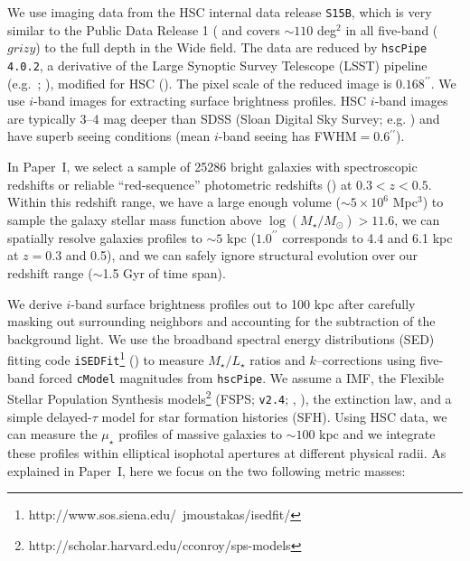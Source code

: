 \documentclass[a4paper,fleqn,usenatbib]{mnras}
\def\arcsec{{\prime\prime}}
\def\asec{$^{\prime\prime}$}
\def\cmodel{\texttt{cModel}}
\def\logms{{$\log (M_{\star}/M_{\odot})$}}
\def\m2l{{$M_{\star}/L_{\star}$}}
\def\mden{{$\mu_{\star}$}}
\begin{document}
    We use imaging data from the HSC internal data release 
    \texttt{S15B}, which is very similar to the Public Data Release 1 
    (\citealt{HSC-DR1} and covers ${\sim} 110$ deg$^2$ in all five-band ($grizy$) to 
    the full depth in the Wide field. 
    The data are reduced by \texttt{hscPipe 4.0.2}, a derivative of the 
    Large Synoptic Survey Telescope (LSST) pipeline (e.g.\ \citealt{Juric2015}; 
    \citealt{Axelrod2010}), modified for HSC (\citealt{HSC-PIPE}).
    The pixel scale of the reduced image is $0.168$\asec{}.
    We use $i$-band images for extracting surface brightness profiles. 
    HSC $i$-band images are typically 3--4 mag deeper than SDSS 
    (Sloan Digital Sky Survey; e.g. \citealt{SDSS-DR7, SDSS-DR8, SDSS-DR12})  
    and have superb seeing conditions (mean $i$-band seeing has FWHM$=0.6$\asec{}).
    
    In Paper~I, we select a sample of 25286 bright galaxies with spectroscopic 
    redshifts or reliable ``red-sequence'' photometric redshifts (\citealt{Rykoff2014}) 
    at $0.3<z<0.5$. 
    Within this redshift range, we have a large enough volume 
    ($\sim5\times 10^6$ Mpc$^3$) to sample the galaxy stellar mass function above 
    \logms$>11.6$, we can spatially resolve galaxies profiles to $\sim 5$ kpc 
    ($1.0^{\arcsec}$ corresponds to 4.4 and 6.1 kpc at $z=0.3$ and 0.5), and we can 
    safely ignore structural evolution over our redshift range ($\sim$1.5 Gyr of 
    time span).
    
    We derive $i$-band surface brightness profiles out to 100 kpc after carefully 
    masking out surrounding neighbors and accounting for the subtraction of the 
    background light. 
    We use the broadband spectral energy distributions (SED) fitting code 
    \texttt{iSEDFit}\footnote{http://www.sos.siena.edu/~jmoustakas/isedfit/} 
    (\citealt{Moustakas13}) to measure \m2l{} ratios and $k$--corrections using 
    five-band forced \cmodel{} magnitudes from \texttt{hscPipe}. 
    We assume a \citet{Chabrier2003} IMF, the Flexible Stellar Population 
    Synthesis models\footnote{http://scholar.harvard.edu/cconroy/sps-models}
    (FSPS; \texttt{v2.4}; \citealt{FSPS}, \citealt{Conroy2010}), the 
    \citet{Calzetti2000} extinction law, and a simple delayed-$\tau$ model for 
    star formation histories (SFH). 
    Using HSC data, we can measure the \mden{} profiles of massive galaxies to 
    $\sim 100$ kpc and we integrate these profiles within elliptical isophotal
    apertures at different physical radii. 
    As explained in Paper~I, here we focus on the two following metric masses:
        
\end{document}
